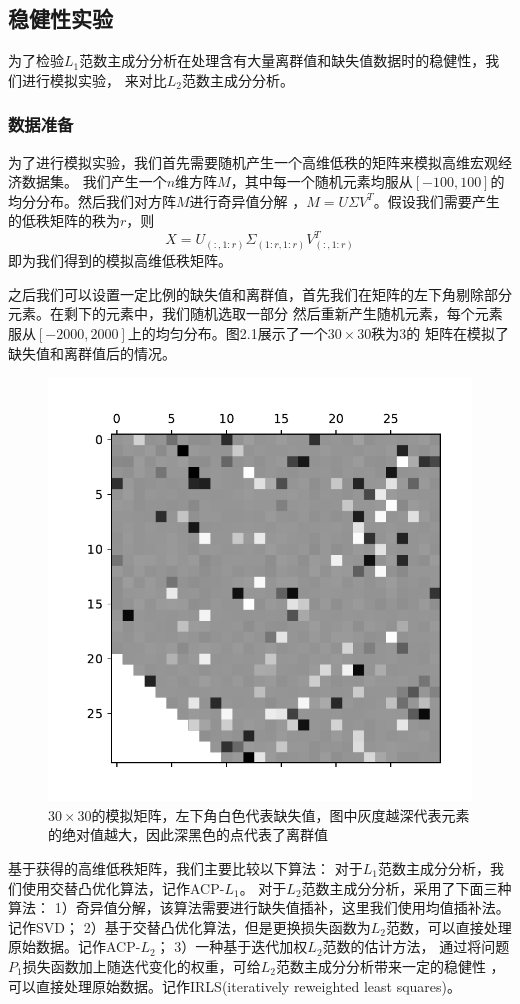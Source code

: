 \subsection{稳健性实验}\label{lab-1}
为了检验$L_1$范数主成分分析在处理含有大量离群值和缺失值数据时的稳健性，我们进行模拟实验，
来对比$L_2$范数主成分分析。

\subsubsection{数据准备}
为了进行模拟实验，我们首先需要随机产生一个高维低秩的矩阵来模拟高维宏观经济数据集。
我们产生一个$n$维方阵$M$，其中每一个随机元素均服从$[-100, 100]$的均分分布。然后我们对方阵$M$进行奇异值分解
，$M = U\Sigma V^{T}$。假设我们需要产生的低秩矩阵的秩为$r$，则$$X = U_{(:,1:r)}\Sigma_{(1:r,1:r)}V^T_{(:,1:r)}$$
即为我们得到的模拟高维低秩矩阵。

之后我们可以设置一定比例的缺失值和离群值，首先我们在矩阵的左下角剔除部分元素。在剩下的元素中，我们随机选取一部分
然后重新产生随机元素，每个元素服从$[-2000,2000]$上的均匀分布。图2.1展示了一个$30\times30$秩为3的
矩阵在模拟了缺失值和离群值后的情况。

\begin{figure}[H]
    \centering
    \includegraphics[width=.5\textwidth]{pics/chapter2/matrix.pdf}
    \caption{\small $30\times30$的模拟矩阵，左下角白色代表缺失值，图中灰度越深代表元素的绝对值越大，因此深黑色的点代表了离群值}
    \label{fig2.1}
\end{figure}

基于获得的高维低秩矩阵，我们主要比较以下算法：
对于$L_1$范数主成分分析，我们使用交替凸优化算法，记作ACP-$L_1$。
对于$L_2$范数主成分分析，采用了下面三种算法：
1）奇异值分解，该算法需要进行缺失值插补，这里我们使用均值插补法。记作SVD；
2）基于交替凸优化算法，但是更换损失函数为$L_2$范数，可以直接处理原始数据。记作ACP-$L_2$；
3）一种基于迭代加权$L_2$范数的估计方法\cite{srebro2003weighted}，
通过将问题$P_1$损失函数加上随迭代变化的权重，可给$L_2$范数主成分分析带来一定的稳健性
，可以直接处理原始数据。记作IRLS(iteratively reweighted least squares)。

